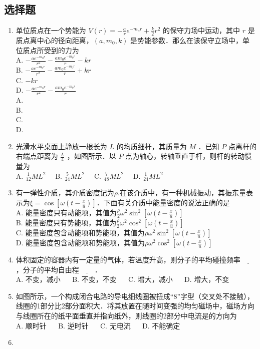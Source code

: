 
\subsection{选择题}
\begin{enumerate}
\item 单位质点在一个势能为 $V(r) = -\frac{a}{r}e^{-m_{o}r}+\frac{k}{2}r^{2}$ 的保守力场中运动，其中 $r$ 是质点离中心的径向距离，$(a,m_{0},k)$ 是势能参数．那么在该保守立场中，单位质点所受到的力为\\
A. $-\frac{ae^{-m_{0}r}}{r^{2}}-\frac{am_{0}e^{-m_{0}r}}{r}-kr$\\
B. $-\frac{ae^{-m_{0}r}}{r^{2}}-\frac{am_{0}e^{-m_{0}r}}{r}+kr$\\
C. $-kr$\\
D. $-\frac{ae^{-m_{0}r}}{r^{2}}-\frac{am_{0}e^{-m_{0}r}}{r}$\\

A. \\
B. \\
C. \\
D. \\

\item 光滑水平桌面上静放一根长为 $L$ 的均质细杆，其质量为 $M$ ．已知 $P$ 点离杆的右端点距离为 $\frac{L}{4}$ ，如图所示．以 $P$ 点为轴心，转轴垂直于杆，则杆的转动惯量为\\
A. $\frac{1}{12}ML^{2} \quad$
B. $\frac{5}{24}ML^{2} \quad$
C. $\frac{7}{48}ML^{2} \quad$
D. $\frac{1}{24}ML^{2} \quad$

\item 有一弹性介质，其介质密度记为$\rho$.在该介质中，有一种机械振动，其振东量表示为$\xi = \cos{[\omega(t-\frac{x}{u})]}$．下面有关介质中能量密度的说法正确的是\\
A. 能量密度只有动能项，其值为$\frac{\rho}{2}\omega^{2}\sin^{2}{[\omega(t-\frac{x}{u})]}$\\
B. 能量密度只有势能项，其值为$\frac{\rho}{2}\omega^{2}\cos^{2}{[\omega(t-\frac{x}{u})]}$\\
C. 能量密度包含动能项和势能项，其值为$\rho\omega^{2}\sin^{2}{[\omega(t-\frac{x}{u})]}$\\
D. 能量密度包含动能项和势能项，其值为$\rho\omega^{2}\cos^{2}{[\omega(t-\frac{x}{u})]}$\\

\item 体积固定的容器内有一定量的气体，若温度升高，则分子的平均碰撞频率$\underline{~~~~~~~~~~}$，分子的平均自由程$\underline{~~~~~~~~~~}$．\\
A. 不变，减小 $\quad$
B. 不变，不变 $\quad$
C. 增大，减小 $\quad$
D. 增大，不变 $\quad$

\item 如图所示，一个构成闭合电路的导电细线圈被扭成“8”字型（交叉处不接触），线圈的1部分比2部分面积大．将其放置在随时间变强的均匀磁场中，磁场方向与线圈所在的纸平面垂直并指向纸外，则线圈的2部分中电流是的方向为\\
A. 顺时针 $\quad$
B. 逆时针 $\quad$
C. 无电流 $\quad$
D. 不能确定 $\quad$

\item 
\end{enumerate}